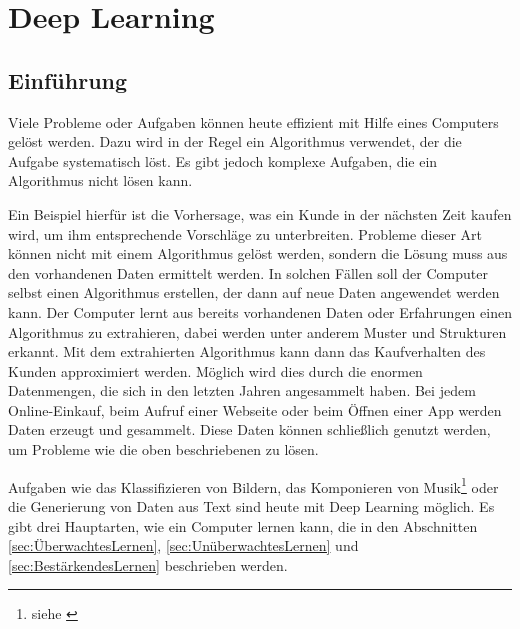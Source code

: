 \section{Deep Learning}
\subsection{Einführung}
Viele Probleme oder Aufgaben können heute effizient mit Hilfe eines Computers gelöst werden. Dazu wird in der Regel ein \gls{Algorithmus} verwendet, der die Aufgabe systematisch löst. Es gibt jedoch komplexe Aufgaben, die ein \gls{Algorithmus} nicht lösen kann.

Ein Beispiel hierfür ist die Vorhersage, was ein Kunde in der nächsten Zeit kaufen wird, um ihm entsprechende Vorschläge zu unterbreiten. Probleme dieser Art können nicht mit einem Algorithmus gelöst werden, sondern die Lösung muss aus den vorhandenen Daten ermittelt werden. In solchen Fällen soll der Computer selbst einen Algorithmus erstellen, der dann auf neue Daten angewendet werden kann. Der Computer lernt aus bereits vorhandenen Daten oder Erfahrungen einen Algorithmus zu extrahieren, dabei werden unter anderem Muster und Strukturen erkannt. Mit dem extrahierten Algorithmus kann dann das Kaufverhalten des Kunden approximiert werden. Möglich wird dies durch die enormen Datenmengen, die sich in den letzten Jahren angesammelt haben. Bei jedem Online-Einkauf, beim Aufruf einer Webseite oder beim Öffnen einer App werden Daten erzeugt und gesammelt. Diese Daten können schließlich genutzt werden, um Probleme wie die oben beschriebenen zu lösen.\cite[vgl.][]{Alpaydin2014}

Aufgaben wie das Klassifizieren von Bildern, das Komponieren von Musik\footnote{siehe \cite{GoogleMusicLM} } oder die Generierung von Daten aus Text sind heute mit Deep Learning möglich. Es gibt drei Hauptarten, wie ein Computer lernen kann, die in den Abschnitten \ref{sec:ÜberwachtesLernen}, \ref{sec:UnüberwachtesLernen} und \ref{sec:BestärkendesLernen} beschrieben werden.

